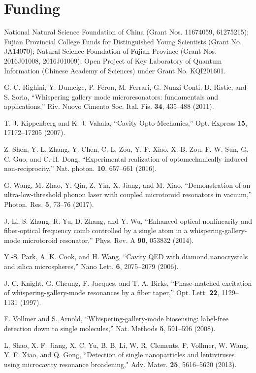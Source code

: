 \documentclass[aps,onecolumn,superscriptaddress,showpacs]{revtex4}
\begin{document}
\section*{Funding}
National Natural Science Foundation of China (Grant Nos. 11674059, 61275215); Fujian Provincial College Funds for Distinguished Young Scientists (Grant No. JA14070); Natural Science Foundation of Fujian Province (Grant Nos. 2016J01008, 2016J01009); Open Project of Key Laboratory of Quantum Information (Chinese Academy of Sciences) under Grant No. KQI201601.
\begin{thebibliography}{99}
G. C. Righini, Y. Dumeige, P. F\'{e}ron, M. Ferrari, G. Nunzi Conti, D. Ristic, and S. Soria,
 ``Whispering gallery mode microresonators: fundamentals and applications,'' Riv. Nuovo Cimento Soc. Ital. Fis. \textbf{34}, 435--488 (2011).

T. J. Kippenberg and K. J. Vahala, ``Cavity Opto-Mechanics,'' Opt. Express \textbf{15}, 17172--17205 (2007).

Z. Shen, Y.-L. Zhang, Y. Chen, C.-L. Zou, Y.-F. Xiao, X.-B. Zou, F.-W. Sun, G.-C. Guo, and C.-H. Dong, ``Experimental realization of optomechanically induced non-reciprocity,'' Nat. photon. \textbf{10}, 657--661 (2016).

G. Wang, M. Zhao, Y. Qin, Z. Yin, X. Jiang, and M. Xiao, ``Demonstration of an ultra-low-threshold phonon laser with coupled microtoroid resonators in vacuum,'' Photon. Res. \textbf{5}, 73--76 (2017).

J. Li, S. Zhang, R. Yu, D. Zhang, and Y. Wu,
``Enhanced optical nonlinearity and fiber-optical frequency comb controlled by a single atom
in a whispering-gallery-mode microtoroid resonator,'' Phys. Rev. A \textbf{90}, 053832 (2014).

Y.-S. Park, A. K. Cook, and H. Wang, ``Cavity QED with diamond nanocrystals and silica microspheres,'' Nano Lett. \textbf{6}, 2075--2079 (2006).


J. C. Knight, G. Cheung, F. Jacques, and T. A. Birks, ``Phase-matched excitation of whispering-gallery-mode
  resonances by a fiber taper,'' Opt. Lett. \textbf{22}, 1129--1131 (1997).

F. Vollmer and S. Arnold, ``Whispering-gallery-mode biosensing: label-free detection down to single molecules,'' Nat. Methods \textbf{5},
591--596 (2008).

L. Shao, X. F. Jiang, X. C. Yu, B. B. Li, W. R. Clements, F. Vollmer, W. Wang,
  Y. F. Xiao, and Q. Gong, ``Detection of single nanoparticles and
  lentiviruses using microcavity resonance broadening," Adv. Mater. \textbf{25}, 5616--5620 (2013).


\end{thebibliography}
\end{document}
